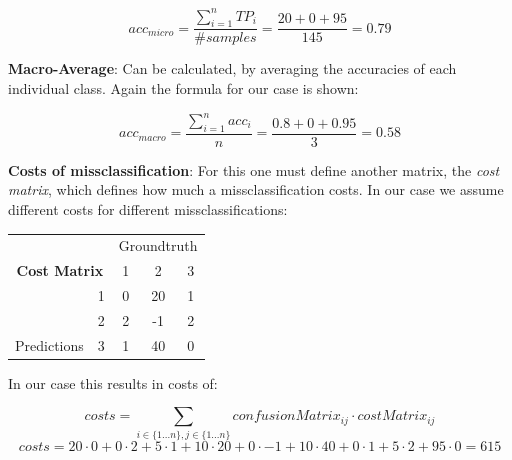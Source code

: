 \documentclass[12pt,a4paper]{article}
\begin{document}
\[acc_{micro} = \frac{\sum_{i=1}^{n} TP_i}{\#samples} = \frac{20 + 0 + 95}{145} = 0.79\]

\noindent \textbf{Macro-Average}: Can be calculated, by averaging the accuracies of each individual class. Again the formula for our case is shown:

\[acc_{macro} = \frac{\sum_{i=1}^{n} acc_i}{n} = \frac{0.8 + 0 + 0.95}{3} = 0.58\]

\noindent \textbf{Costs of missclassification}: For this one must define another matrix, the \textit{cost matrix}, which defines how much a missclassification costs. In our case we assume different costs for different missclassifications:

\begin{table}[h]
\begin{tabular}{|cc|ccc|}
\hline
\multicolumn{2}{|c|}{}                                       & \multicolumn{3}{c|}{Groundtruth}                                                                                             \\ \cline{3-5}
\multicolumn{2}{|c|}{\multirow{-2}{*}{\textbf{Cost Matrix}}} & \multicolumn{1}{c|}{1}                         & \multicolumn{1}{c|}{2}                          & 3                         \\ \hline
\multicolumn{1}{|c|}{}                                 & 1   & \multicolumn{1}{c|}{\cellcolor[HTML]{95C884}0} & \multicolumn{1}{c|}{\cellcolor[HTML]{E49696}20} & \cellcolor[HTML]{E49696}1 \\ \cline{2-5}
\multicolumn{1}{|c|}{}                                 & 2   & \multicolumn{1}{c|}{\cellcolor[HTML]{E49696}2} & \multicolumn{1}{c|}{\cellcolor[HTML]{95C884}-1} & \cellcolor[HTML]{E49696}2 \\ \cline{2-5}
\multicolumn{1}{|c|}{\multirow{-3}{*}{Predictions}}    & 3   & \multicolumn{1}{c|}{\cellcolor[HTML]{E49696}1} & \multicolumn{1}{c|}{\cellcolor[HTML]{E49696}40} & \cellcolor[HTML]{95C884}0 \\ \hline
\end{tabular}
\end{table}

\noindent In our case this results in costs of:

\[costs = \sum_{i \in \{1...n\}, j \in \{1...n\}} confusionMatrix_{ij} \cdot costMatrix_{ij} \]
\[costs = 20 \cdot 0 + 0 \cdot 2 + 5 \cdot 1 + 10 \cdot 20 + 0 \cdot -1 + 10 \cdot 40 + 0 \cdot 1 + 5 \cdot 2 + 95 \cdot 0 = 615 \]
\end{document}
